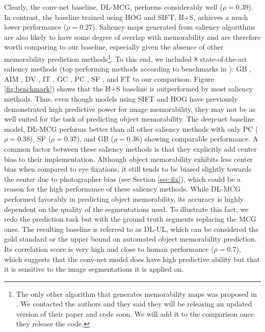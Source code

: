 Clearly, the conv-net baseline, DL-MCG, performs considerably well ($\rho = 0.39$). In contrast, the baseline trained using HOG and SIFT, H+S, achieves a much lower performance ($\rho = 0.27$). Saliency maps generated from saliency algorithms are also likely to have some degree of overlap with memorability and are therefore worth comparing to our baseline, especially given the absence of other memorability prediction methods\footnote{The only other algorithm that generates memorability maps was proposed in \cite{khosla12}. We contacted the authors and they said they will be releasing an updated version of their paper and code soon. We will add it to the comparison once they release the code.}. To this end, we included $8$ state-of-the-art saliency methods (top performing methods according to benchmarks in \cite{borji13,borji12}): GB \cite{gb}, AIM \cite{aim}, DV \cite{dv}, IT \cite{it}, GC \cite{gc}, PC \cite{pc}, SF \cite{sf}, and FT \cite{ft} to our comparison. Figure \ref{fig:benchmark}) shows that the H+S baseline is outperformed by most saliency methods. Thus, even though models using SIFT and HOG have previously demonstrated high predictive power for image memorability, they may not be as well suited for the task of predicting object memorability. The deep-net baseline model, DL-MCG performs better than all other saliency methods with only PC ($\rho=0.38$), SF ($\rho=0.37$), and GB ($\rho=0.36$) showing  comparable performance. A common factor between these saliency methods is that they explicitly add center bias to their implementation. Although object memorability exhibits less center bias when compared to eye fixations, it still tends to be biased slightly towards the center due to photographer bias (see Section \ref{sec:fix}), which could be a  reason for the high performance of these saliency methods. %
While DL-MCG performed favorably in predicting object memorability, its accuracy is highly dependent on the quality of the segmentations used. To illustrate this fact, we redo the prediction task but with the ground truth segments replacing the MCG ones. The resulting baseline is referred to as DL-UL, which can be considered the gold standard or the upper bound on automated object memorability prediction. Its correlation score is very high  and close to human performance ($\rho = 0.7$), which suggests that the conv-net model does have high predictive ability but that it is sensitive to the image segmentations it is applied on. %





